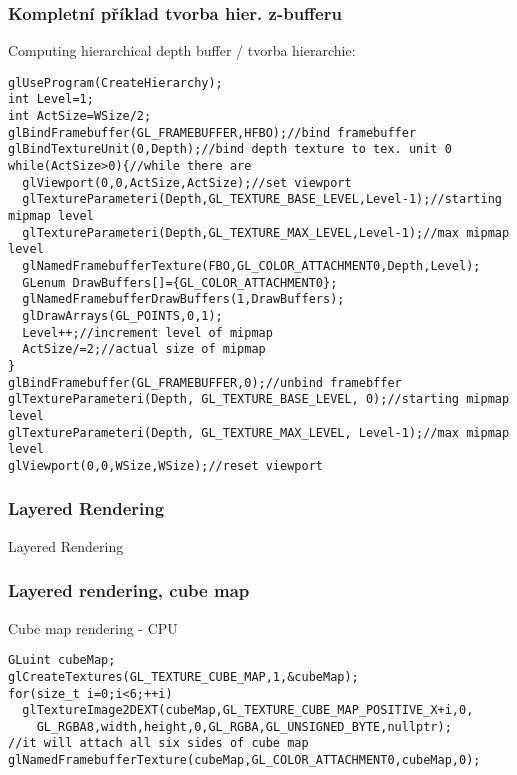 \begin{frame}[fragile]\frametitle{Kompletní příklad tvorba hier. z-bufferu}\scriptsize
  Computing hierarchical depth buffer / tvorba hierarchie:
\begin{verbatim}
glUseProgram(CreateHierarchy);
int Level=1;
int ActSize=WSize/2;
glBindFramebuffer(GL_FRAMEBUFFER,HFBO);//bind framebuffer
glBindTextureUnit(0,Depth);//bind depth texture to tex. unit 0
while(ActSize>0){//while there are
  glViewport(0,0,ActSize,ActSize);//set viewport
  glTextureParameteri(Depth,GL_TEXTURE_BASE_LEVEL,Level-1);//starting mipmap level
  glTextureParameteri(Depth,GL_TEXTURE_MAX_LEVEL,Level-1);//max mipmap level
  glNamedFramebufferTexture(FBO,GL_COLOR_ATTACHMENT0,Depth,Level);
  GLenum DrawBuffers[]={GL_COLOR_ATTACHMENT0};
  glNamedFramebufferDrawBuffers(1,DrawBuffers);
  glDrawArrays(GL_POINTS,0,1);
  Level++;//increment level of mipmap
  ActSize/=2;//actual size of mipmap
}
glBindFramebuffer(GL_FRAMEBUFFER,0);//unbind framebffer
glTextureParameteri(Depth, GL_TEXTURE_BASE_LEVEL, 0);//starting mipmap level
glTextureParameteri(Depth, GL_TEXTURE_MAX_LEVEL, Level-1);//max mipmap level
glViewport(0,0,WSize,WSize);//reset viewport
\end{verbatim}
\end{frame}


\begin{frame}
\frametitle{Layered Rendering}
\begin{center}
\Huge {\color{white}Layered Rendering}
\end{center}
\end{frame}

\begin{frame}[fragile]
\frametitle{Layered rendering, cube map}
Cube map rendering - CPU
{\scriptsize
\begin{verbatim}
GLuint cubeMap;
glCreateTextures(GL_TEXTURE_CUBE_MAP,1,&cubeMap);
for(size_t i=0;i<6;++i)
  glTextureImage2DEXT(cubeMap,GL_TEXTURE_CUBE_MAP_POSITIVE_X+i,0,
    GL_RGBA8,width,height,0,GL_RGBA,GL_UNSIGNED_BYTE,nullptr);
//it will attach all six sides of cube map
glNamedFramebufferTexture(cubeMap,GL_COLOR_ATTACHMENT0,cubeMap,0);
\end{verbatim}
}
\end{frame}

